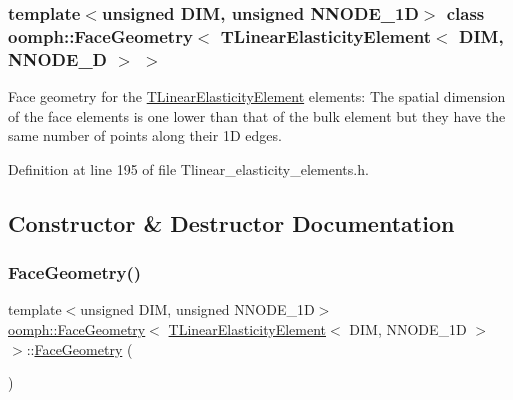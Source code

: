 \subsubsection*{template$<$unsigned D\+IM, unsigned N\+N\+O\+D\+E\+\_\+1D$>$\newline
class oomph\+::\+Face\+Geometry$<$ T\+Linear\+Elasticity\+Element$<$ D\+I\+M, N\+N\+O\+D\+E\+\_\+D $>$ $>$}

Face geometry for the \hyperlink{classoomph_1_1TLinearElasticityElement}{T\+Linear\+Elasticity\+Element} elements\+: The spatial dimension of the face elements is one lower than that of the bulk element but they have the same number of points along their 1D edges. 

Definition at line 195 of file Tlinear\+\_\+elasticity\+\_\+elements.\+h.



\subsection{Constructor \& Destructor Documentation}
\mbox{\label{classoomph_1_1FaceGeometry_3_01TLinearElasticityElement_3_01DIM_00_01NNODE__1D_01_4_01_4_a94fc7f3850033e0ab5ebcc1208d22b25}} 
\subsubsection{\texorpdfstring{Face\+Geometry()}{FaceGeometry()}}
{\footnotesize\ttfamily template$<$unsigned D\+IM, unsigned N\+N\+O\+D\+E\+\_\+1D$>$ \\
\hyperlink{classoomph_1_1FaceGeometry}{oomph\+::\+Face\+Geometry}$<$ \hyperlink{classoomph_1_1TLinearElasticityElement}{T\+Linear\+Elasticity\+Element}$<$ D\+IM, N\+N\+O\+D\+E\+\_\+1D $>$ $>$\+::\hyperlink{classoomph_1_1FaceGeometry}{Face\+Geometry} (\begin{DoxyParamCaption}{ }\end{DoxyParamCaption})\hspace{0.3cm}{\ttfamily [inline]}}



